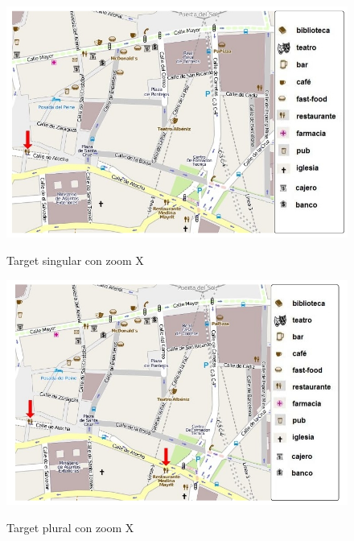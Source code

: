 \begin{figure}

\begin{minipage}[b]{0.5\linewidth}
\centering
\includegraphics[width=\textwidth]{figures/rest-singular.png}\\[0pt]
\vspace*{.1cm}
\caption{Target singular con zoom X}
\label{rest-singular}
\end{minipage}
\hspace*{0cm}
\begin{minipage}[b]{0.5\linewidth}
\centering
\includegraphics[width=\textwidth]{figures/rest-plural.png}\\[0pt]
\vspace*{.1cm}
\caption{Target plural con zoom X}
\label{rest-plural}
\end{minipage}
\end{figure}

